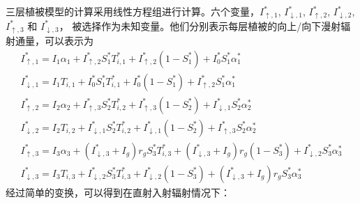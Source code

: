 三层植被模型的计算采用线性方程组进行计算。六个变量，$I_{\uparrow,1}^\ast$, $I_{\downarrow,1}^\ast$, $I_{\uparrow,2}^\ast$, $I_{\downarrow,2}^\ast$, $I_{\uparrow,3}^\ast$ 和 $I_{\downarrow,3}^\ast$，
被选择作为未知变量。他们分别表示每层植被的向上/向下漫射辐射通量，可以表示为
\begin{equation}
\begin{array}{l}I_{\uparrow, 1}^{*}=I_{1} \alpha_{1}+I_{\uparrow, 2}^{*} S_{1}^{*} T_{i, 1}^{*}+I_{\uparrow, 2}^{*}\left(1-S_{1}^{*}\right)+I_{0}^{*} S_{1}^{*} \alpha_{1}^{*} 
    \\ I_{\downarrow, 1}^{*}=I_{1} T_{i, 1}+I_{0}^{*} S_{1}^{*} T_{i, 1}^{*}+I_{0}^{*}\left(1-S_{1}^{*}\right)+I_{\uparrow, 2}^{*} S_{1}^{*} \alpha_{1}^{*} 
    \\ I_{\uparrow, 2}^{*}=I_{2} \alpha_{2}+I_{\uparrow, 3}^{*} S_{2}^{*} T_{i, 2}^{*}+I_{\uparrow, 3}^{*}\left(1-S_{2}^{*}\right)+I_{\downarrow, 1}^{*} S_{2}^{*} \alpha_{2}^{*}
     \\ I_{\downarrow, 2}^{*}=I_{2} T_{i, 2}+I_{\downarrow, 1}^{*} S_{2}^{*} T_{i, 2}^{*}+I_{\downarrow, 1}^{*}\left(1-S_{2}^{*}\right)+I_{\uparrow, 3}^{*} S_{2}^{*} \alpha_{2}^{*} 
     \\ I_{\uparrow, 3}^{*}=I_{3} \alpha_{3}+\left(I_{\downarrow, 3}^{*}+I_{g}\right) r_{g} S_{3}^{*} T_{i, 3}^{*}+\left(I_{\downarrow, 3}^{*}+I_{g}\right) r_{g}\left(1-S_{3}^{*}\right)+I_{\downarrow, 2}^{*} S_{3}^{*} \alpha_{3}^{*} 
     \\ I_{\downarrow, 3}^{*}=I_{3} T_{i, 3}+I_{\downarrow, 2}^{*} S_{3}^{*} T_{i, 3}^{*}+I_{\downarrow, 2}^{*}\left(1-S_{3}^{*}\right)+\left(I_{\downarrow, 3}^{*}+I_{g}\right) r_{g} S_{3}^{*} \alpha_{3}^{*}\end{array}
\end{equation}
经过简单的变换，可以得到在直射入射辐射情况下：
